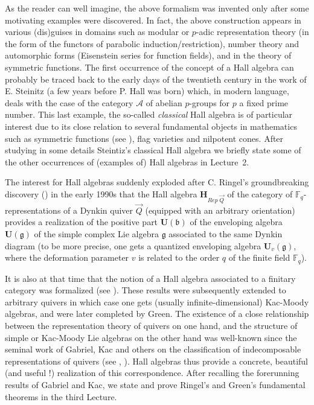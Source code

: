\documentclass[a4paper,10pt]{amsart}
\def\H{\mathbf{H}}
\def\U{\mathbf{U}}
\def\bo{\mathfrak{b}}
\numberwithin{equation}{section}
\begin{document}
\vspace{.1in}

As the reader can well imagine, the above formalism was invented only after some motivating examples were discovered. In fact, the above construction appears in various (dis)guises in domains such as modular or $p$-adic representation theory (in the form of the functors of parabolic induction/restriction), number theory and automorphic forms (Eisenstein series for function fields), and in the theory of symmetric functions. The first occurrence of the concept of a Hall algebra can probably be traced back to the early days of the twentieth century in the work of E. Steinitz (a few years before P. Hall was born) which, in modern language, deals with the case of the category $\mathcal{A}$ of abelian $p$-groups for $p$ a fixed prime number. This last example, the so-called \textit{classical} Hall algebra is of particular interest due to its close relation to several fundamental objects in mathematics such as symmetric functions (see \cite{Mac}), flag varieties and nilpotent cones. After studying in some details Steintiz's classical Hall algebra we briefly state some of the other occurrences of (examples of) Hall algebras in Lecture~2.

\vspace{.1in}

The interest for Hall algebras suddenly exploded after C. Ringel's groundbreaking discovery (\cite{Ri}) in the early 1990s that the Hall algebra $\H_{{Rep}\;\vec{Q}}$ of the category of $\mathbb{F}_q$-representations of a Dynkin quiver $\vec{Q}$ (equipped with an arbitrary orientation) provides a realization of the positive part $\U(\bo)$ of the enveloping algebra $\U(\mathfrak{g})$ of the simple complex Lie algebra $\mathfrak{g}$ associated to the same Dynkin diagram (to be more precise, one gets a quantized enveloping algebra $\U_v (\mathfrak{g})$, where the deformation parameter $v$ is related to the order $q$ of the finite field $\mathbb{F}_q$).

 \vspace{.1in}

It is also at that time that the notion of a Hall algebra associated to a finitary category was formalized (see \cite{R2}). These results were subsequently extended to arbitrary quivers in which case one gets (usually infinite-dimensional) Kac-Moody algebras, and were later completed by Green. The existence of a close relationship between the representation theory of quivers on one hand, and the structure of simple or Kac-Moody Lie algebras on the other hand was well-known since the seminal work of Gabriel, Kac and others on the classification of indecomposable representations of quivers (see \cite{Gabriel}, \cite{Kac}). Hall algebras thus provide a concrete, beautiful (and useful !) realization of this correspondence. After recalling the forerunning results of Gabriel and Kac, we state and prove Ringel's and Green's fundamental theorems in the third Lecture.
\end{document}

